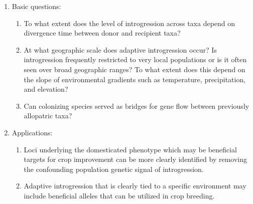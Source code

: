 \documentclass[11pt]{article}
\newcommand{\lwang}[1]{\textcolor{red}{ \emph{\scriptsize  #1}} } %
\newcommand{\gmj}[1]{\textcolor{blue}{ \emph{\scriptsize  #1}} } %
\begin{document}
\begin{enumerate}
	\item{Basic questions:}
		\begin{enumerate}
		 	\item{To what extent does the level of introgression across taxa depend on divergence time between donor and recipient taxa?} %
		 	\item{At what geographic scale does adaptive introgression occur? Is introgression frequently restricted to very local populations or is it often seen over broad geographic ranges? To what extent does this depend on the slope of environmental gradients such as temperature, precipitation, and elevation?}%
		 	\item{Can colonizing species served as bridges for gene flow between previously allopatric taxa?} %
		\end{enumerate} 	
	\item{Applications:}
		\begin{enumerate}
		 	\item{Loci underlying the domesticated phenotype which may be beneficial targets for crop improvement can be more clearly identified by removing the confounding population genetic signal of introgression.} %
		 	\item{Adaptive introgression that is clearly tied to a specific environment may include beneficial alleles that can be utilized in crop breeding.}%
		 \end{enumerate}
\end{enumerate}



\end{document}
